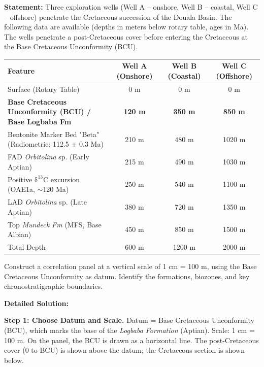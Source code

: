 \documentclass[11pt]{article}
\begin{document}
\begin{exoresolu}
\textbf{Statement:} Three exploration wells (Well A -- onshore, Well B -- coastal, Well C -- offshore) penetrate the Cretaceous succession of the Douala Basin. The following data are available (depths in meters below rotary table, ages in Ma). The wells penetrate a post-Cretaceous cover before entering the Cretaceous at the Base Cretaceous Unconformity (BCU).

\begin{center}
\begin{tabular}{|l|c|c|c|}
\hline
\textbf{Feature} & \textbf{Well A (Onshore)} & \textbf{Well B (Coastal)} & \textbf{Well C (Offshore)} \\
\hline
Surface (Rotary Table) & 0 m & 0 m & 0 m \\
\hline
\textbf{Base Cretaceous Unconformity (BCU) / Base Logbaba Fm} & \textbf{120 m} & \textbf{350 m} & \textbf{850 m} \\
\hline
Bentonite Marker Bed "Beta" (Radiometric: 112.5 $\pm$ 0.3 Ma) & 210 m & 480 m & 1020 m \\
\hline
FAD \emph{Orbitolina} sp. (Early Aptian) & 215 m & 490 m & 1030 m \\
\hline
Positive \ensuremath{\mathrm{\delta^{13}C}} excursion (OAE1a, $\sim$120 Ma) & 250 m & 540 m & 1100 m \\
\hline
LAD \emph{Orbitolina} sp. (Late Aptian) & 380 m & 720 m & 1350 m \\
\hline
Top \emph{Mundeck Fm} (MFS, Base Albian) & 450 m & 850 m & 1500 m \\
\hline
Total Depth & 600 m & 1200 m & 2000 m \\
\hline
\end{tabular}
\end{center}

Construct a correlation panel at a vertical scale of 1 cm = 100 m, using the Base Cretaceous Unconformity as datum. Identify the formations, biozones, and key chronostratigraphic boundaries.

\textbf{Detailed Solution:}

\noindent\textbf{Step 1: Choose Datum and Scale.} Datum = Base Cretaceous Unconformity (BCU), which marks the base of the \emph{Logbaba Formation} (Aptian). Scale: 1 cm = 100 m. On the panel, the BCU is drawn as a horizontal line. The post-Cretaceous cover (0 to BCU) is shown above the datum; the Cretaceous section is shown below.


\end{exoresolu}
\end{document}
